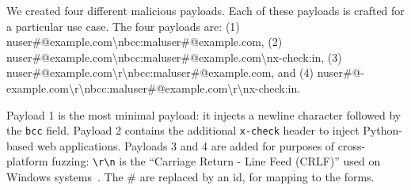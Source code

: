 We created four different malicious payloads. Each of these payloads
is crafted for a particular use case. The four payloads are:
(1) nuser\#@example.com\textbackslash{}n\-bcc:\-maluser\-\#\-@example.com,
(2) nuser\#@\-example.com\textbackslash{}n\-bcc:\-maluser\-\#\-@example.com\textbackslash{}n\-x-check:in,
(3) nuser\#\-@\-example.com\textbackslash{}r\textbackslash{}n\-bcc:\-maluser\#\-@example.com,
and (4) nuser\#\-@-\break example.com\-\textbackslash{}r\textbackslash{}n\-bcc:\-maluser\#\-@example.\-com\textbackslash{}r\textbackslash{}n\-x-check:in.
	
Payload 1 is the most minimal payload: it injects a newline character followed by the \lstinline{bcc} field. Payload 2 contains the additional \lstinline{x-check} header to inject Python-based web applications. Payloads 3 and 4 are added for purposes of cross-platform fuzzing: \lstinline{\r\n} is the ``Carriage Return - Line Feed (CRLF)'' used on Windows systems~\cite{rfc2616}. The \# are replaced by an id, for mapping to the forms.




